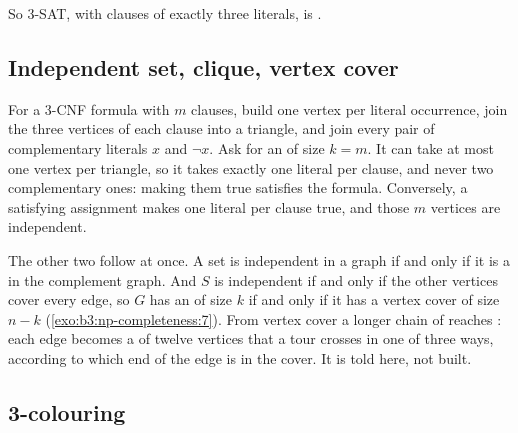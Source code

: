 \label{out:b3:np-completeness:3sat}

So 3-SAT, with clauses of exactly three literals, is .

\subsection{Independent set, clique, vertex cover}

For a 3-CNF formula with $m$ clauses, build one vertex per literal occurrence, join the three vertices of each clause into a triangle, and join every pair of complementary literals $x$ and $\neg x$. Ask for an  of size $k = m$. It can take at most one vertex per triangle, so it takes exactly one literal per clause, and never two complementary ones: making them true satisfies the formula. Conversely, a satisfying assignment makes one literal per clause true, and those $m$ vertices are independent.

\label{lst:b3:np-completeness:is}

\label{out:b3:np-completeness:is}

The other two follow at once. A set is independent in a graph if and only if it is a  in the complement graph. And $S$ is independent if and only if the other vertices cover every edge, so $G$ has an  of size $k$ if and only if it has a vertex cover of size $n - k$ (\cref{exo:b3:np-completeness:7}). From vertex cover a longer chain of  reaches : each edge becomes a  of twelve vertices that a tour crosses in one of three ways, according to which end of the edge is in the cover. It is told here, not built.

\subsection{3-colouring}

